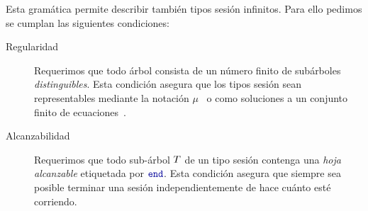 Esta gramática permite describir también tipos sesión infinitos. Para ello
pedimos se cumplan las siguientes condiciones:
\begin{description}

	\item[Regularidad] Requerimos que todo árbol consista de un número
		finito de subárboles \emph{distinguibles}. Esta condición
		asegura que los tipos sesión sean representables mediante la
		notación $\mu$~\cite{Pierce02} o como soluciones a un
		conjunto finito de ecuaciones~\cite{Courcelle83}.

	\item[Alcanzabilidad] Requerimos que todo sub-árbol $T$ de
		un tipo sesión contenga una \emph{hoja alcanzable} etiquetada por
		$\End$. Esta condición asegura que siempre sea posible terminar una
		sesión independientemente de hace cuánto esté corriendo.
\end{description}
